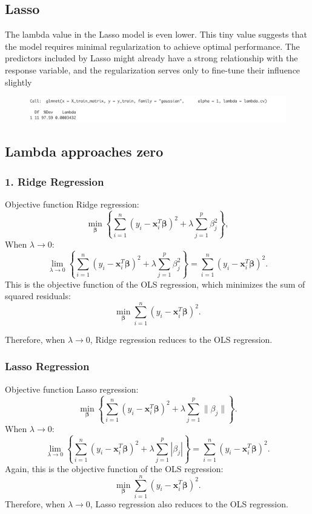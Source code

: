 \documentclass{article}
\begin{document}
\subsection{Lasso}
The lambda value in the Lasso model is even lower. This tiny value suggests that the model requires minimal regularization to achieve optimal performance.
The predictors included by Lasso might already have a strong relationship with the response variable, and the regularization serves only to fine-tune their influence slightly
\begin{figure}[H]
   \centering
   \includegraphics[width=\linewidth]{images/lasso.png}
   \label{fig:fig22}
\end{figure}
\subsection{Lambda approaches zero}
\subsubsection{1. Ridge Regression}
Objective function Ridge regression:
\[
\min_{\boldsymbol{\beta}} \left\{ \sum_{i=1}^{n} (y_i - \mathbf{x}_i^T \boldsymbol{\beta})^2 + \lambda \sum_{j=1}^{p} \beta_j^2 \right\},
\]
When \(\lambda \to 0\):
\[
\lim_{\lambda \to 0} \left\{ \sum_{i=1}^{n} (y_i - \mathbf{x}_i^T \boldsymbol{\beta})^2 + \lambda \sum_{j=1}^{p} \beta_j^2 \right\} = \sum_{i=1}^{n} (y_i - \mathbf{x}_i^T \boldsymbol{\beta})^2.
\]
This is the objective function of the OLS regression, which minimizes the sum of squared residuals:
\[
\min_{\boldsymbol{\beta}} \sum_{i=1}^{n} (y_i - \mathbf{x}_i^T \boldsymbol{\beta})^2.
\]

Therefore, when \(\lambda \to 0\), Ridge regression reduces to the OLS regression.
\subsubsection{Lasso Regression}
Objective function Lasso regression:
\[
\min_{\boldsymbol{\beta}} \left\{ \sum_{i=1}^{n} (y_i - \mathbf{x}_i^T \boldsymbol{\beta})^2 + \lambda \sum_{j=1}^{p} \|\beta_j\| \right\}.
\]
When \(\lambda \to 0\):
\[
\lim_{\lambda \to 0} \left\{ \sum_{i=1}^{n} (y_i - \mathbf{x}_i^T \boldsymbol{\beta})^2 + \lambda \sum_{j=1}^{p} |\beta_j| \right\} = \sum_{i=1}^{n} (y_i - \mathbf{x}_i^T \boldsymbol{\beta})^2.
\]
Again, this is the objective function of the OLS regression:
\[
\min_{\boldsymbol{\beta}} \sum_{i=1}^{n} (y_i - \mathbf{x}_i^T \boldsymbol{\beta})^2.
\]
Therefore, when \(\lambda \to 0\), Lasso regression also reduces to the OLS regression.
\end{document}
